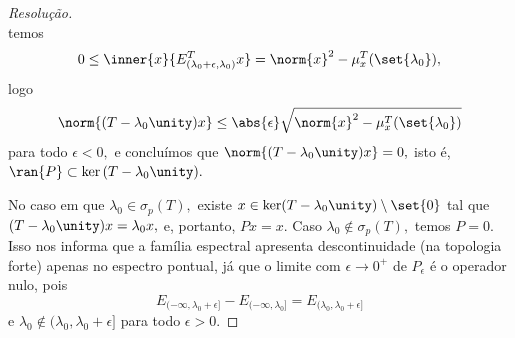 \begin{proof}[Resolução]
\begin{equation*}
  \end{equation*}
  temos
  \begin{equation*}
    0 \leq \inner{x}{E^T_{(\lambda_0 + \epsilon, \lambda_0)}x} = \norm{x}^2 - \mu_x^T(\set{\lambda_0}),
  \end{equation*}
  logo
  \begin{equation*}
    \norm{(T - \lambda_0\unity)x} \leq \abs{\epsilon}\sqrt{\norm{x}^2 - \mu_x^T(\set{\lambda_0})}
  \end{equation*}
  para todo \(\epsilon < 0,\) e concluímos que \(\norm{(T - \lambda_0\unity)x} = 0,\) isto é, \(\ran{P} \subset \ker{(T - \lambda_0\unity)}.\)

  No caso em que \(\lambda_0 \in \sigma_p(T),\) existe \(x \in \ker(T - \lambda_0 \unity) \setminus \set{0}\) tal que \((T - \lambda_0 \unity)x = \lambda_0x,\) e, portanto, \(Px = x.\) Caso \(\lambda_0 \notin \sigma_p(T),\) temos \(P = 0.\) Isso nos informa que a família espectral apresenta descontinuidade (na topologia forte) apenas no espectro pontual, já que o limite com \(\epsilon \to 0^{+}\) de \(P_\epsilon\) é o operador nulo, pois
  \begin{equation*}
    E_{(-\infty,\lambda_0+\epsilon]} - E_{(-\infty, \lambda_0]} = E_{(\lambda_0, \lambda_0+\epsilon]}
  \end{equation*}
  e \(\lambda_0 \notin (\lambda_0, \lambda_0+\epsilon]\) para todo \(\epsilon > 0.\)
\end{proof}
